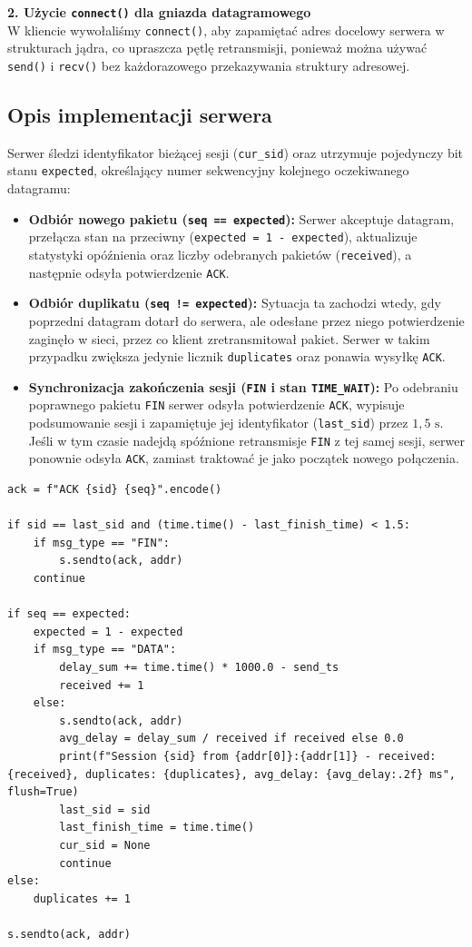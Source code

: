 \documentclass[12pt,a4paper]{article}
\begin{document}
\noindent \textbf{2. Użycie \texttt{connect()} dla gniazda datagramowego} \\
W kliencie wywołaliśmy \texttt{connect()}, aby zapamiętać adres docelowy serwera w strukturach jądra, co upraszcza pętlę retransmisji, ponieważ można używać \texttt{send()} i \texttt{recv()} bez każdorazowego przekazywania struktury adresowej.

\subsection*{Opis implementacji serwera}

Serwer śledzi identyfikator bieżącej sesji (\texttt{cur\_sid}) oraz utrzymuje pojedynczy bit stanu \texttt{expected}, określający numer sekwencyjny kolejnego oczekiwanego datagramu:
\begin{itemize}
    \item \textbf{Odbiór nowego pakietu (\texttt{seq == expected}):} Serwer akceptuje datagram, przełącza stan na przeciwny (\texttt{expected = 1 - expected}), aktualizuje statystyki opóźnienia oraz liczby odebranych pakietów (\texttt{received}), a następnie odsyła potwierdzenie \texttt{ACK}.
    \item \textbf{Odbiór duplikatu (\texttt{seq != expected}):} Sytuacja ta zachodzi wtedy, gdy poprzedni datagram dotarł do serwera, ale odesłane przez niego potwierdzenie zaginęło w sieci, przez co klient zretransmitował pakiet. Serwer w takim przypadku zwiększa jedynie licznik \texttt{duplicates} oraz ponawia wysyłkę \texttt{ACK}.
    \item \textbf{Synchronizacja zakończenia sesji (\texttt{FIN} i stan \texttt{TIME\_WAIT}):} Po odebraniu poprawnego pakietu \texttt{FIN} serwer odsyła potwierdzenie \texttt{ACK}, wypisuje podsumowanie sesji i zapamiętuje jej identyfikator (\texttt{last\_sid}) przez $1{,}5\text{ s}$. Jeśli w tym czasie nadejdą spóźnione retransmisje \texttt{FIN} z tej samej sesji, serwer ponownie odsyła \texttt{ACK}, zamiast traktować je jako początek nowego połączenia.
\end{itemize}

\begin{lstlisting}
ack = f"ACK {sid} {seq}".encode()

if sid == last_sid and (time.time() - last_finish_time) < 1.5:
    if msg_type == "FIN":
        s.sendto(ack, addr)
    continue

if seq == expected:
    expected = 1 - expected
    if msg_type == "DATA":
        delay_sum += time.time() * 1000.0 - send_ts
        received += 1
    else:
        s.sendto(ack, addr)
        avg_delay = delay_sum / received if received else 0.0
        print(f"Session {sid} from {addr[0]}:{addr[1]} - received: {received}, duplicates: {duplicates}, avg_delay: {avg_delay:.2f} ms", flush=True)
        last_sid = sid
        last_finish_time = time.time()
        cur_sid = None
        continue
else:
    duplicates += 1

s.sendto(ack, addr)
\end{lstlisting}
\end{document}
